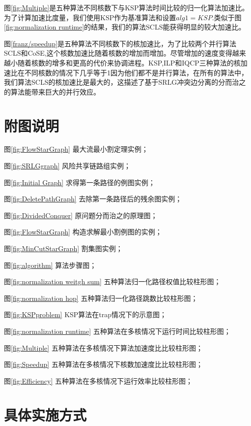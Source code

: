图\ref{fig:Multiple}是五种算法不同核数下与KSP算法时间比较的归一化算法加速比。为了计算加速比度量，我们使用KSP作为基准算法和设置$alg1=KSP$.类似于图\ref{fig:normalization runtime}的结果，我们的算法SCLS能获得明显的较大加速比。

图\ref{franz/speedup}是五种算法不同核数下的核加速比，为了比较两个并行算法SCLS和CoSE,这个核数加速比随着核数的增加而增加。尽管增加的速度变得越来越小随着核数的增多和更高的代价来协调进程。KSP,ILP和IQCP三种算法的核加速比在不同核数的情况下几乎等于1因为他们都不是并行算法，在所有的算法中，我们算法SCLS的核加速比是最大的，这描述了基于SRLG冲突边分离的分而治之的算法能带来巨大的并行效应。

\section*{附图说明}
图\ref{fig:FlowStarGraph} 最大流最小割定理实例；

图\ref{fig:SRLGgraph} 风险共享链路组实例；

图\ref{fig:Initial Graph} 求得第一条路径的例图实例；

图\ref{fig:DeletePathGraph} 去除第一条路径后的残余图实例；

图\ref{fig:DividedConquer} 原问题分而治之的原理图；

图\ref{fig:FlowStarGraph} 构造求解最小割例图的实例；

图\ref{fig:MinCutStarGraph} 割集图实例；

图\ref{fig:algorithm} 算法步骤图；

图\ref{fig:normalization weitgh sum} 五种算法归一化路径权值比较柱形图；

图\ref{fig:normalization hop} 五种算法归一化路径跳数比较柱形图；

图\ref{fig:KSPproblem}  KSP算法在trap情况下的示意图；

图\ref{fig:normalization runtime}  五种算法在多核情况下运行时间比较柱形图；

图\ref{fig:Multiple}  五种算法在多核情况下算法加速度比比较柱形图；

图\ref{fig:Speedup}  五种算法在多核情况下核数加速度比比较柱形图；

图\ref{fig:Efficiency}  五种算法在多核情况下运行效率比较柱形图；

\section*{具体实施方式}
